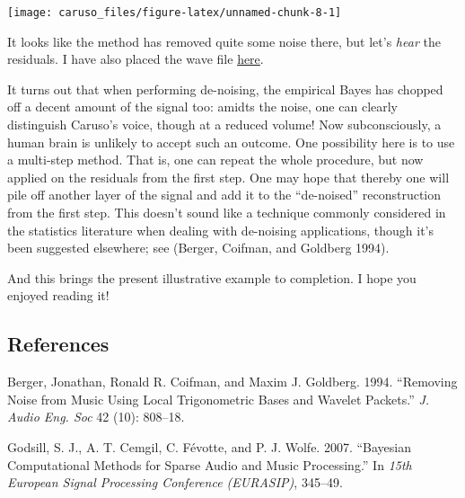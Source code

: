 \documentclass[]{tufte-handout}
\newenvironment{Shaded}{}{}
\newcommand{\KeywordTok}[1]{\textcolor[rgb]{0.00,0.44,0.13}{\textbf{#1}}}
\newcommand{\DataTypeTok}[1]{\textcolor[rgb]{0.56,0.13,0.00}{#1}}
\newcommand{\DecValTok}[1]{\textcolor[rgb]{0.25,0.63,0.44}{#1}}
\newcommand{\StringTok}[1]{\textcolor[rgb]{0.25,0.44,0.63}{#1}}
\newcommand{\OperatorTok}[1]{\textcolor[rgb]{0.40,0.40,0.40}{#1}}
\newcommand{\NormalTok}[1]{#1}
\begin{document}
\texttt{[image: caruso\_files/figure-latex/unnamed-chunk-8-1]}

It looks like the method has removed quite some noise there, but let's
\emph{hear} the residuals. I have also placed the wave file
\href{caruso_residuals.wav}{here}.

\begin{Shaded}
\end{Shaded}

It turns out that when performing de-noising, the empirical Bayes has
chopped off a decent amount of the signal too: amidts the noise, one can
clearly distinguish Caruso's voice, though at a reduced volume! Now
subconsciously, a human brain is unlikely to accept such an outcome. One
possibility here is to use a multi-step method. That is, one can repeat
the whole procedure, but now applied on the residuals from the first
step. One may hope that thereby one will pile off another layer of the
signal and add it to the ``de-noised'' reconstruction from the first
step. This doesn't sound like a technique commonly considered in the
statistics literature when dealing with de-noising applications, though
it's been suggested elsewhere; see (Berger, Coifman, and Goldberg 1994).

And this brings the present illustrative example to completion. I hope
you enjoyed reading it!

\subsection*{References}\label{references}

\hypertarget{refs}{}
\hypertarget{ref-berger94}{}
Berger, Jonathan, Ronald R. Coifman, and Maxim J. Goldberg. 1994.
``Removing Noise from Music Using Local Trigonometric Bases and Wavelet
Packets.'' \emph{J. Audio Eng. Soc} 42 (10): 808--18.

\hypertarget{ref-godsill07}{}
Godsill, S. J., A. T. Cemgil, C. Févotte, and P. J. Wolfe. 2007.
``Bayesian Computational Methods for Sparse Audio and Music
Processing.'' In \emph{15th European Signal Processing Conference
(EURASIP)}, 345--49.
\end{document}
